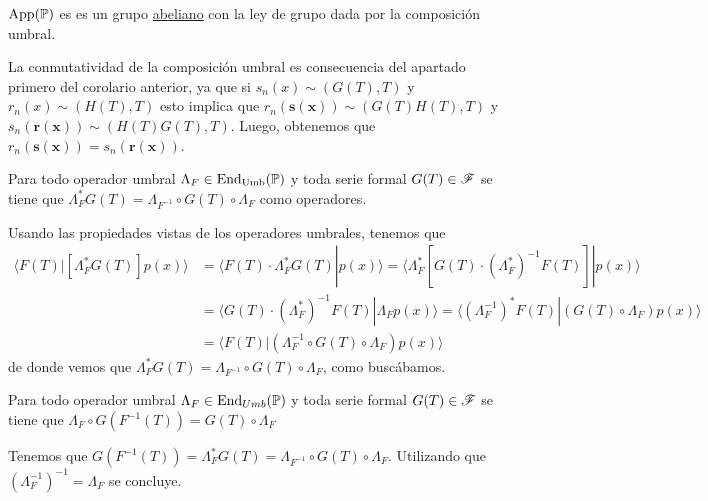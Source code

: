 \begin{corolario}
    $\operatorname*{App(\mathbb{P})}$ es es un grupo \underline{abeliano} con la ley de grupo dada por la composición umbral.
\end{corolario}

\begin{demo}
    La conmutatividad de la composición umbral es consecuencia del apartado primero del corolario anterior, ya que si $s_n(x) \sim (G(T), T)$ y $r_n(x) \sim (H(T), T)$ esto implica que $r_n(\mathbf{s(x)}) \sim (G(T)H(T), T)$ y $s_n(\mathbf{r(x)}) \sim (H(T)G(T), T)$. Luego, obtenemos que $r_n(\mathbf{s(x)}) = s_n(\mathbf{r(x)})$.
\end{demo}

\begin{teorema}
    Para todo operador umbral $\Lambda_F \in \operatorname*{End}_{\mathrm{Umb}}(\mathbb{P})$ y toda serie formal $G(T) \in \mathscr{F}$ se tiene que $\Lambda_F^* G(T) = \Lambda_{F^{-1}} \circ G(T) \circ \Lambda_F$ como operadores.
\end{teorema}

\begin{demo}
    Usando las propiedades vistas de los operadores umbrales, tenemos que
    \begin{align*}
        \langle F(T) | [\Lambda_F^* G(T)] p(x) \rangle & = \langle F(T) \cdot \Lambda_F^*G(T)| p(x) \rangle = \langle \Lambda_F^* [G(T) \cdot (\Lambda_F^*)^{-1}F(T)]| p(x) \rangle \\
        & = \langle G(T) \cdot (\Lambda_F^*)^{-1}F(T) | \Lambda_F p(x) \rangle 
        = \langle (\Lambda_F^{-1})^* F(T) | (G(T) \circ \Lambda_F) p(x) \rangle \\
        & = \langle F(T) | (\Lambda_F^{-1} \circ G(T) \circ \Lambda_F) p(x) \rangle
    \end{align*}
    de donde vemos que $\Lambda_F^* G(T) = \Lambda_{F^{-1}} \circ G(T) \circ \Lambda_F$, como buscábamos.
\end{demo}

\begin{corolario}\label{conmutacion composicion operador umbral}
    Para todo operador umbral $\Lambda_F \in \operatorname*{End}_{Umb}(\mathbb{P})$ y toda serie formal $G(T) \in \mathscr{F}$ se tiene que $\Lambda_F \circ G(F^{-1}(T)) = G(T) \circ \Lambda_F$
\end{corolario}

\begin{demo}
    Tenemos que $G(F^{-1}(T)) = \Lambda_F^* G(T) = \Lambda_{F^{-1}} \circ G(T) \circ \Lambda_F$. Utilizando que $(\Lambda_F^{-1})^{-1} = \Lambda_F$ se concluye.
\end{demo}

